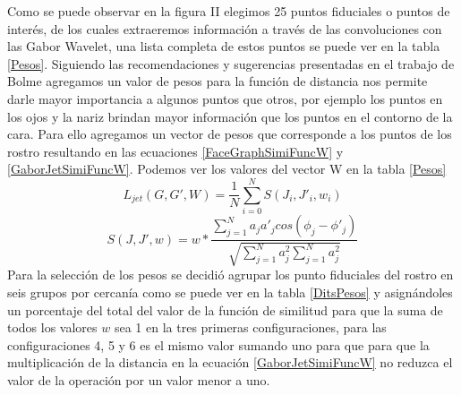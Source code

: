 Como se puede observar en la figura II elegimos 25 puntos fiduciales o puntos de interés, de los cuales extraeremos información a través de las convoluciones con las Gabor Wavelet, una lista completa de estos puntos se puede ver en la tabla \ref{Pesos}.
Siguiendo las recomendaciones y sugerencias presentadas en el trabajo de Bolme \cite{bolme2003elastic} agregamos un valor de pesos para la función de distancia nos permite darle mayor importancia a algunos puntos que otros, por ejemplo los puntos en  los ojos y la nariz brindan mayor información que los puntos en el contorno de la cara.
Para ello agregamos un vector de pesos que corresponde a los puntos de los rostro resultando en las ecuaciones \ref{FaceGraphSimiFuncW} y \ref{GaborJetSimiFuncW}. Podemos ver los valores del vector W en la tabla \ref{Pesos}
\begin{equation}
\label{FaceGraphSimiFuncW}
L_{jet}(G,G',W)=\frac{1}{N}\sum_{i=0}^{N}S(J_{i},J'_{i},w_{i})
\end{equation}
\begin{equation}
\label{GaborJetSimiFuncW}
S(J,J',w)=w*\frac{\sum_{j=1}^{N}a_j a'_jcos(\phi_j-\phi'_j)}{\sqrt{\sum_{j=1}^{N}a_j^2 \sum_{j=1}^{N}a_j^2}}
\end{equation}
Para la selección de los pesos se decidió agrupar los punto fiduciales del rostro en seis grupos por cercanía como se puede ver en la tabla \ref{DitsPesos} y asignándoles un porcentaje del total del valor de la función de similitud para que la suma de todos los valores $w$ sea 1 en la tres primeras configuraciones, para las configuraciones 4, 5 y 6 es el mismo valor sumando uno para que para que la multiplicación de la distancia en la ecuación \ref{GaborJetSimiFuncW} no reduzca el valor de la operación por un valor menor a uno.

